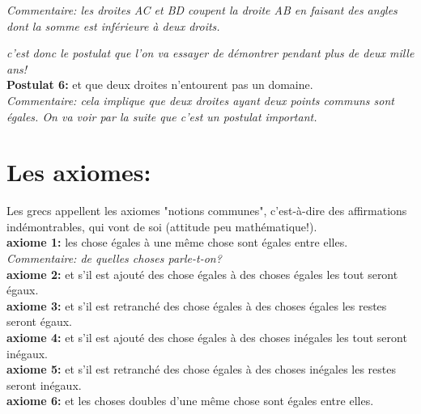 \documentclass[a4paper, 12pt, twoside]{book}
\begin{document}
 
\textit{Commentaire: les droites AC et BD coupent la droite AB en faisant des angles dont la somme est inférieure à deux droits.} \
 
\textit{c'est donc le postulat que l'on va essayer de démontrer pendant plus de deux mille ans! 
}\\



\textbf{Postulat 6:} et que deux droites n'entourent pas un domaine.\\



 
\textit{Commentaire: cela implique que deux droites ayant deux points communs sont égales. On va voir par la suite que c'est un postulat important.} \\


\section{Les axiomes:}

Les grecs appellent les axiomes "notions communes", c'est-à-dire des affirmations indémontrables, qui vont de soi (attitude peu mathématique!).\\

\textbf{axiome 1:} les chose égales à une même chose sont égales entre elles.\\



 
\textit{Commentaire: de quelles choses parle-t-on? } \\

\textbf{axiome 2:} et s'il est ajouté des chose égales à des choses égales les tout  seront égaux.\\



 
\textbf{axiome 3:} et s'il est retranché des chose égales à des choses égales les restes  seront égaux.\\



 
\textbf{axiome 4:} et s'il est ajouté des chose égales à des choses inégales les tout  seront inégaux.\\

\textbf{axiome 5:} et s'il est retranché des chose égales à des choses inégales les restes  seront inégaux.\\

\textbf{axiome 6:} et les choses doubles d'une même chose sont égales entre elles.\\
\end{document}
